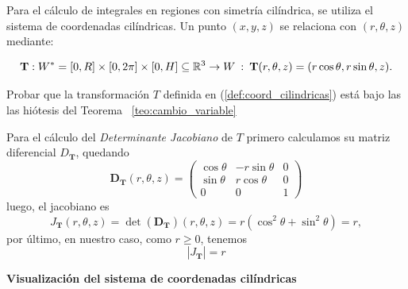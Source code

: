 
\label{sec:cilindricas}
\vspace{0.2cm}

Para el cálculo de integrales en regiones con simetría cilíndrica, se utiliza el sistema de coordenadas cilíndricas. Un punto $(x, y, z)$ se relaciona con $(r, \theta, z)$ mediante:

\begin{equation}\label{def:coord_cilindricas}
\mathbf{T}:W^*=[0,R]\times[0, 2\pi]\times[0,H] \subseteq\mathbb{R}^3 \to W\: : \: \mathbf{T}(r, \theta,z ) =( r \cos \theta , r \sin \theta,z ).
\end{equation} 

\begin{tarea} Probar que la transformaci\'on $T$ definida en (\ref{def:coord_cilindricas}) est\'a bajo las las hi\'otesis del Teorema  ~\ref{teo:cambio_variable}
\end{tarea}

\vspace{0.2cm}

Para el c\'alculo del \emph{Determinante Jacobiano} de $T$  primero  calculamos su  matriz diferencial $D_\mathbf{T}$, quedando
       \begin{equation*}
       \boldsymbol{D}_{\mathbf{T}}(r, \theta,z ) 
       =
       \begin{pmatrix}
       \cos\theta & -r\sin\theta & 0 \\
       \sin\theta & r\cos\theta & 0 \\
       0 & 0 & 1
       \end{pmatrix}
 \end{equation*}
 luego, el jacobiano es
       \begin{equation}\label{ejemplo_jacobiano_polares}
       J_{\mathbf{T}}(r, \theta,z) = \det(\boldsymbol{D}_{\mathbf{T}})(r, \theta,z) = 
      r(\cos^2\theta + \sin^2\theta) = r,
      \end{equation} 
 por \'ultimo,  en nuestro caso,  como $r \geq 0$, tenemos
\begin{equation}
|J_{\mathbf{T}}| = r
\end{equation}

\textbf{Visualización del sistema de coordenadas cilíndricas}

\begin{figure}[H]
    \centering
     
    \label{fig:interpretacion fisica}
\end{figure}